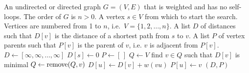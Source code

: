 
\begin{algorithmic}[1]
\Require An undirected or directed graph $G = (V, E)$ that is weighted
  and has no self-loops. The order of $G$ is $n > 0$. A vertex $s \in V$
  from which to start the search. Vertices are numbered from 1 to $n$,
  i.e.~$V = \{1, 2, \dots, n\}$.
\Ensure A list $D$ of distances such that $D[v]$ is the distance of a
  shortest path from $s$ to $v$. A list $P$ of vertex parents such
  that $P[v]$ is the parent of $v$, i.e. $v$ is adjacent from $P[v]$.
\State $D \gets [\infty, \infty, \dots, \infty]$
\State $D[s] \gets 0$
\State $P \gets [\,]$
\State $Q \gets V$
  \State find $v \in Q$ such that $D[v]$ is minimal\label{alg:dijkstra_general:find_vertex_minimal_distance}
  \State $Q \gets \operatorname*{remove}(Q, v)$
      \State $D[u] \gets D[v] + w(vu)$
      \State $P[u] \gets v$
    \EndIf
  \EndFor
\EndWhile
\State \Return $(D, P)$
\end{algorithmic}
